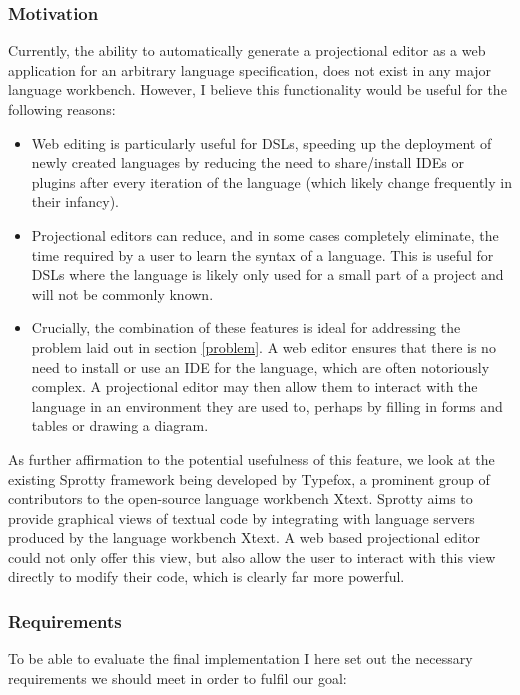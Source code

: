 \documentclass{article}
\begin{document}
\subsubsection{Motivation}\label{motivation}
Currently, the ability to automatically generate a projectional editor as a web application for an arbitrary language specification, does not exist in any major language workbench. However, I believe this functionality would be useful for the following reasons:
\begin{itemize}
\item Web editing is particularly useful for DSLs, speeding up the deployment of newly created languages by reducing the need to share/install IDEs or plugins after every iteration of the language (which likely change frequently in their infancy). 
\item Projectional editors can reduce, and in some cases completely eliminate, the time required by a user to learn the syntax of a language. This is useful for DSLs where the language is likely only used for a small part of a project and will not be commonly known.
\item Crucially, the combination of these features is ideal for addressing the problem laid out in section \ref{problem}. A web editor ensures that there is no need to install or use an IDE for the language, which are often notoriously complex. A projectional editor may then allow them to interact with the language in an environment they are used to, perhaps by filling in forms and tables or drawing a diagram.  
\end{itemize} 
As further affirmation to the potential usefulness of this feature, we look at the existing Sprotty framework being developed by Typefox\cite{sprotty}, a prominent group of contributors to the open-source language workbench Xtext\cite{xtext}. Sprotty aims to provide graphical views of textual code by integrating with language servers produced by the language workbench Xtext. A web based projectional editor could not only offer this view, but also allow the user to interact with this view directly to modify their code, which is clearly far more powerful. 

\subsubsection{Requirements}\label{requirements}
To be able to evaluate the final implementation I here set out the necessary requirements we should meet in order to fulfil our goal: 
\end{document}
